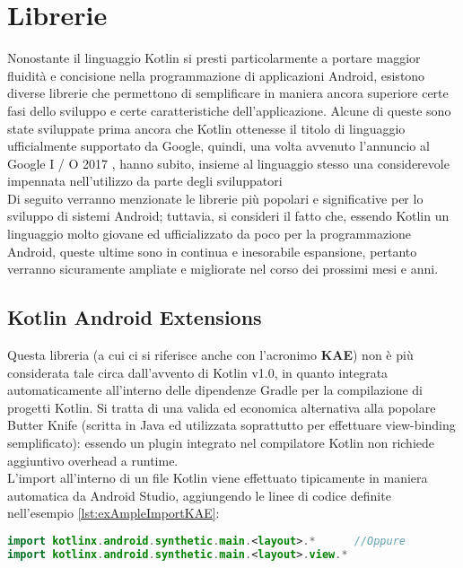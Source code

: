 \section{Librerie}
Nonostante il linguaggio Kotlin si presti particolarmente a portare maggior fluidità e concisione nella programmazione di applicazioni Android, esistono diverse librerie che permettono di semplificare in maniera ancora superiore certe fasi dello sviluppo e certe caratteristiche dell'applicazione. Alcune di queste sono state sviluppate prima ancora che Kotlin ottenesse il titolo di linguaggio ufficialmente supportato da Google, quindi, una volta avvenuto l'annuncio al Google I / O 2017 \cite{googleio}, hanno subito, insieme al linguaggio stesso una considerevole impennata nell'utilizzo da parte degli sviluppatori\\
Di seguito verranno menzionate le librerie più popolari e significative per lo sviluppo di sistemi Android; tuttavia, si consideri il fatto che, essendo Kotlin un linguaggio molto giovane ed ufficializzato da poco per la programmazione Android, queste ultime sono in continua e inesorabile espansione, pertanto verranno sicuramente ampliate e migliorate nel corso dei prossimi mesi e anni.\\

\subsection{Kotlin Android Extensions}
Questa libreria (a cui ci si riferisce anche con l’acronimo {\bfseries KAE}) non è più considerata tale circa dall'avvento di Kotlin v1.0, in quanto integrata automaticamente all'interno delle dipendenze Gradle per la compilazione di progetti Kotlin. Si tratta di una valida ed economica alternativa alla popolare Butter Knife (scritta in Java ed utilizzata soprattutto per effettuare view-binding semplificato): essendo un plugin integrato nel compilatore Kotlin non richiede aggiuntivo overhead a runtime.\\
L'import all'interno di un file Kotlin viene effettuato tipicamente in maniera automatica da Android Studio, aggiungendo le linee di codice definite nell'esempio \ref{lst:exAmpleImportKAE}:\\

\begin{lstlisting}[caption={Import delle Kotlin Android Extensions}, captionpos=b, label={lst:exAmpleImportKAE}, language=Kotlin]
import kotlinx.android.synthetic.main.<layout>.*      //Oppure
import kotlinx.android.synthetic.main.<layout>.view.*
\end{lstlisting}

